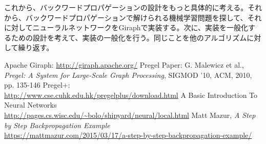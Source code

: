 \documentclass[]{iplresume} %
\begin{document}
これから、バックワードプロパゲーションの設計をもっと具体的に考える。それから、バックワードプロパゲーションで解けられる機械学習問題を探して、それに対してニューラルネットワークをGiraphで実装する。次に、実装を一般化するための設計を考えて、実装の一般化を行う。同じことを他のアルゴリズムに対して繰り返す。

\begin{thebibliography}{9}
Apache Giraph: \url{http://giraph.apache.org/}
Pregel Paper: G. Malewicz et al., \textit{Pregel: A System for Large-Scale Graph Processing}, SIGMOD '10, ACM, 2010, pp. 135-146
Pregel$+$: \\
\url{http://www.cse.cuhk.edu.hk/pregelplus/download.html}
A Basic Introduction To Neural Networks \\
\url{http://pages.cs.wisc.edu/~bolo/shipyard/neural/local.html}
Matt Mazur, \textit{A Step by Step Backpropagation Example} \\
\url{https://mattmazur.com/2015/03/17/a-step-by-step-backpropagation-example/}
\end{thebibliography}
\end{document}
